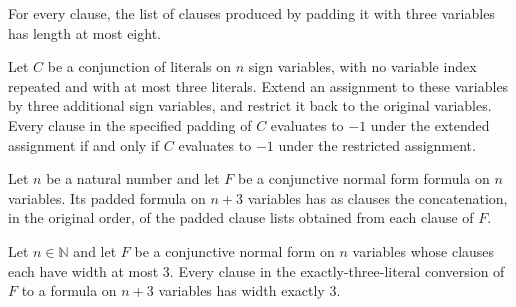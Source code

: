 \begin{theorem}
\label{FABL.exactlyThreePadClause_length_le_eight}
\leanok
{}
For every clause, the list of clauses produced by padding it with three variables has
length at most eight.
\end{theorem}

\begin{theorem}
\label{FABL.exactlyThreePadClause_eval_iff}
\leanok
{}
Let $C$ be a conjunction of literals on $n$ sign variables, with no variable index
repeated and with at most three literals. Extend an assignment to these variables by
three additional sign variables, and restrict it back to the original variables. Every
clause in the specified padding of $C$ evaluates to $-1$ under the extended assignment
if and only if $C$ evaluates to $-1$ under the restricted assignment.
\end{theorem}

\begin{definition}
\label{FABL.exactlyThreeCNF}
\leanok
{}
Let $n$ be a natural number and let $F$ be a conjunctive normal form formula on $n$
variables. Its padded formula on $n+3$ variables has as clauses the concatenation, in
the original order, of the padded clause lists obtained from each clause of $F$.
\end{definition}

\begin{theorem}
\label{FABL.exactlyThreeCNF_clause_width_eq_three}
\leanok
{}
Let $n\in\mathbb{N}$ and let $F$ be a conjunctive normal form on $n$ variables whose
clauses each have width at most $3$. Every clause in the exactly-three-literal
conversion of $F$ to a formula on $n+3$ variables has width exactly $3$.
\end{theorem}


